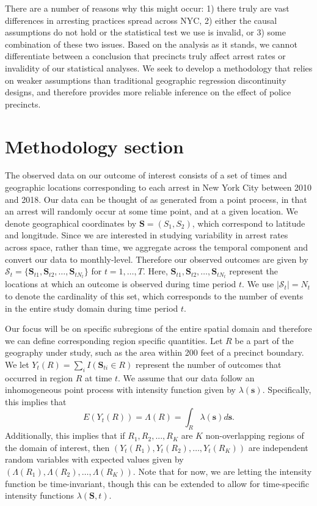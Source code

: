 \documentclass[a4paper,11pt]{article}
\begin{document}
There are a number of reasons why this might occur: 1) there truly are vast differences in arresting practices spread across NYC, 2) either the causal assumptions do not hold or the statistical test we use is invalid, or 3) some combination of these two issues. Based on the analysis as it stands, we cannot differentiate between a conclusion that precincts truly affect arrest rates or invalidity of our statistical analyses. We seek to develop a methodology that relies on weaker assumptions than traditional geographic regression discontinuity designs, and therefore provides more reliable inference on the effect of police precincts. 

\section{Methodology section}

The observed data on our outcome of interest consists of a set of times and geographic locations corresponding to each arrest in New York City between 2010 and 2018. Our data can be thought of as generated from a point process, in that an arrest will randomly occur at some time point, and at a given location. We denote geographical coordinates by $\boldsymbol{S} = (S_{1}, S_{2})$, which correspond to latitude and longitude. Since we are interested in studying variability in arrest rates across space, rather than time, we aggregate across the temporal component and convert our data to monthly-level. Therefore our observed outcomes are given by $\mathcal{S}_t = \{\boldsymbol{S}_{t1}, \boldsymbol{S}_{t2}, \dots, \boldsymbol{S}_{t N_t}\}$ for $t=1, \dots, T$. Here, $\boldsymbol{S}_{t1}, \boldsymbol{S}_{t2}, \dots, \boldsymbol{S}_{t N_t}$ represent the locations at which an outcome is observed during time period $t$. We use $|\mathcal{S}_t| = N_t$ to denote the cardinality of this set, which corresponds to the number of events in the entire study domain during time period $t$. 

Our focus will be on specific subregions of the entire spatial domain and therefore we can define corresponding region specific quantities. Let $R$ be a part of the geography under study, such as the area within 200 feet of a precinct boundary. We let $Y_t(R) = \sum_{i} I(\boldsymbol{S}_{ti} \in R)$ represent the number of outcomes that occurred in region $R$ at time $t$. We assume that our data follow an inhomogeneous point process \citep{daley2003introduction} with intensity function given by $\lambda(\boldsymbol{s})$. Specifically, this implies that $$E(Y_t(R)) = \Lambda(R) = \int_R \lambda(\boldsymbol{s}) d \boldsymbol{s}.$$
Additionally, this implies that if $R_1, R_2,..., R_K$ are $K$ non-overlapping regions of the domain of interest, then $(Y_t(R_1), Y_t(R_2), \dots, Y_t(R_K))$ are independent random variables with expected values given by $(\Lambda(R_1), \Lambda(R_2), \dots, \Lambda(R_K)).$ Note that for now, we are letting the intensity function be time-invariant, though this can be extended to allow for time-specific intensity functions $\lambda(\boldsymbol{S}, t)$. 
\end{document}
